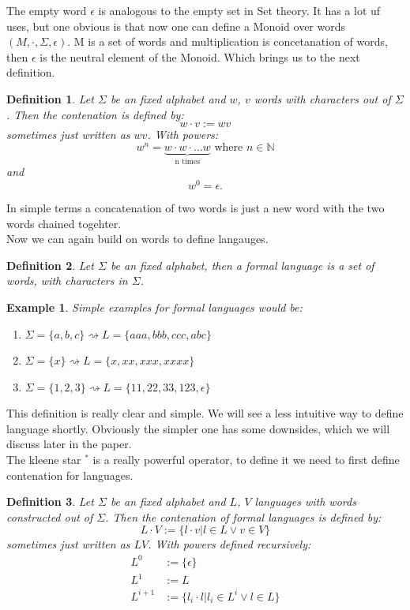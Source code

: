 \documentclass[12pt,letterpaper]{article}
\newtheorem{definition}{Definition}
\newtheorem{example}{Example}[section]
\begin{document}
The empty word $\epsilon$ is analogous to the empty set in Set theory.
It has a lot uf uses, but one obvious is that now one can define 
a Monoid over words $(M, \cdot, \Sigma, \epsilon)$.
M is a set of words and multiplication is concetanation of words, then 
$\epsilon$ is the neutral element of the Monoid. Which brings us to
the next definition.
\begin{definition}
  Let $\Sigma$ be an fixed alphabet and  $w$, $v$ words with 
  characters out of $\Sigma$. Then the contenation is defined by:
  \[ w \cdot v := wv\]
  sometimes just written as $wv$. With powers:
  \[ 
    w^n = \underbrace{w\cdot w \cdot \dots w}_{\text{n times}}
    \text{ where } n \in \mathbb{N}
  \]
  and
  \[ w^0 = \epsilon.\]
\end{definition}
In simple terms a concatenation of two words is just a new word with 
the two words chained togehter.\\
Now we can again build on words to define langauges.
\begin{definition}
  Let $\Sigma$ be an fixed alphabet, then a formal language is a 
  set of words, with characters in $\Sigma$.
\end{definition}
\begin{example}
  Simple examples for formal languages would be:
  \begin{enumerate}
    \item $\Sigma = \{a,b,c\} \rightsquigarrow L = \{aaa, bbb, ccc, abc\}$
    \item $\Sigma = \{x\} \rightsquigarrow L = \{ x, xx, xxx, xxxx\}$
    \item $\Sigma = \{1,2,3\} \rightsquigarrow L = \{11, 22, 33, 123,\epsilon\}$
  \end{enumerate}
\end{example}
This definition is really clear and simple. We will see a less intuitive way to
define language shortly. Obviously the simpler one has some downsides, 
which we will discuss later in the paper. \\
The kleene star $^*$ is a really powerful operator, to define it we need
to first define contenation for languages.
\begin{definition}
  Let $\Sigma$ be an fixed alphabet and  $L$, $V$ languages with 
  words constructed out of $\Sigma$.
  Then the contenation of formal languages is defined by:
  \[ L \cdot V := \{ l \cdot v | l \in L \lor v \in V \}\]
  sometimes just written as $LV$. With powers defined recursively:
  \begin{align*}
      L^0 & := \{\epsilon \}\\
      L^1 & := L  \\
      L^{i+1} & := \{ l_i\cdot l | l_i \in L^i \lor l \in L\}
  \end{align*}
\end{definition}
\end{document}
